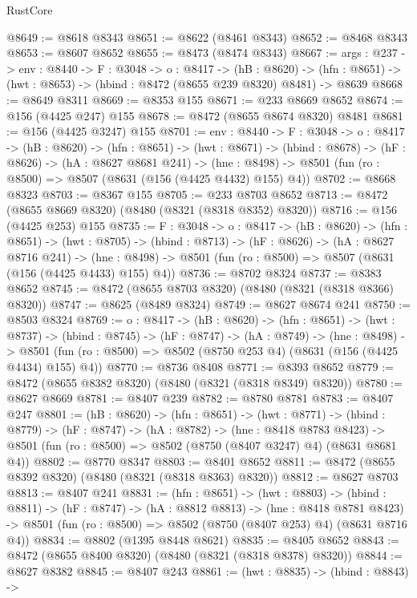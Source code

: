 \begin{lexlean}{RustCore}
\begin{coremodule}
@8649 := @8618 @8343
@8651 := @8622 (@8461 @8343)
@8652 := @8468 @8343
@8653 := @8607 @8652
@8655 := @8473 (@8474 @8343)
@8667 := {args : @237} ->
  {env : @8440} ->
  {F : @3048} ->
  {o : @8417} ->
  (hB : @8620) ->
  (hfn : @8651) -> (hwt : @8653) -> (hbind : @8472 (@8655 @239 @8320) @8481) -> @8639
@8668 := @8649 @8311
@8669 := @8353 @155
@8671 := @233 @8669 @8652
@8674 := @156 (@4425 @247) @155
@8678 := @8472 (@8655 @8674 @8320) @8481
@8681 := @156 (@4425 @3247) @155
@8701 := {env : @8440} ->
  {F : @3048} ->
  {o : @8417} ->
  (hB : @8620) ->
  (hfn : @8651) ->
  (hwt : @8671) ->
  (hbind : @8678) ->
  (hF : @8626) ->
  (hA : @8627 @8681 @241) ->
  (hne : @8498) -> @8501 (fun (ro : @8500) => @8507 (@8631 (@156 (@4425 @4432) @155) @4))
@8702 := @8668 @8323
@8703 := @8367 @155
@8705 := @233 @8703 @8652
@8713 := @8472 (@8655 @8669 @8320) (@8480 (@8321 (@8318 @8352) @8320))
@8716 := @156 (@4425 @253) @155
@8735 := {F : @3048} ->
  {o : @8417} ->
  (hB : @8620) ->
  (hfn : @8651) ->
  (hwt : @8705) ->
  (hbind : @8713) ->
  (hF : @8626) ->
  (hA : @8627 @8716 @241) ->
  (hne : @8498) -> @8501 (fun (ro : @8500) => @8507 (@8631 (@156 (@4425 @4433) @155) @4))
@8736 := @8702 @8324
@8737 := @8383 @8652
@8745 := @8472 (@8655 @8703 @8320) (@8480 (@8321 (@8318 @8366) @8320))
@8747 := @8625 (@8489 @8324)
@8749 := @8627 @8674 @241
@8750 := @8503 @8324
@8769 := {o : @8417} ->
  (hB : @8620) ->
  (hfn : @8651) ->
  (hwt : @8737) ->
  (hbind : @8745) ->
  (hF : @8747) ->
  (hA : @8749) ->
  (hne : @8498) ->
  @8501 (fun (ro : @8500) => @8502 (@8750 @253 @4) (@8631 (@156 (@4425 @4434) @155) @4))
@8770 := @8736 @8408
@8771 := @8393 @8652
@8779 := @8472 (@8655 @8382 @8320) (@8480 (@8321 (@8318 @8349) @8320))
@8780 := @8627 @8669
@8781 := @8407 @239
@8782 := @8780 @8781
@8783 := @8407 @247
@8801 := (hB : @8620) ->
  (hfn : @8651) ->
  (hwt : @8771) ->
  (hbind : @8779) ->
  (hF : @8747) ->
  (hA : @8782) ->
  (hne : @8418 @8783 @8423) ->
  @8501 (fun (ro : @8500) => @8502 (@8750 (@8407 @3247) @4) (@8631 @8681 @4))
@8802 := @8770 @8347
@8803 := @8401 @8652
@8811 := @8472 (@8655 @8392 @8320) (@8480 (@8321 (@8318 @8363) @8320))
@8812 := @8627 @8703
@8813 := @8407 @241
@8831 := (hfn : @8651) ->
  (hwt : @8803) ->
  (hbind : @8811) ->
  (hF : @8747) ->
  (hA : @8812 @8813) ->
  (hne : @8418 @8781 @8423) ->
  @8501 (fun (ro : @8500) => @8502 (@8750 (@8407 @253) @4) (@8631 @8716 @4))
@8834 := @8802 (@1395 @8448 @8621)
@8835 := @8405 @8652
@8843 := @8472 (@8655 @8400 @8320) (@8480 (@8321 (@8318 @8378) @8320))
@8844 := @8627 @8382
@8845 := @8407 @243
@8861 := (hwt : @8835) ->
  (hbind : @8843) ->

\end{coremodule}
\end{lexlean}
